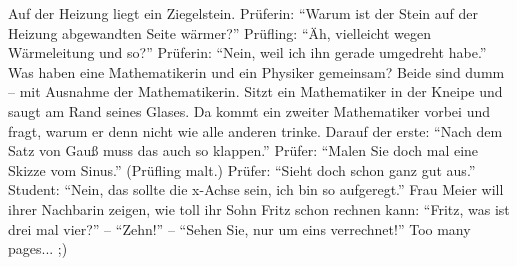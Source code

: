 {	\or Auf der Heizung liegt ein Ziegelstein. Prüferin: \enquote{Warum ist der Stein auf der Heizung abgewandten Seite wärmer?} Prüfling: \enquote{Äh, vielleicht wegen Wärmeleitung und so?} Prüferin: \enquote{Nein, weil ich ihn gerade umgedreht habe.}
	\or Was haben eine Mathematikerin und ein Physiker gemeinsam? Beide sind dumm -- mit Ausnahme der Mathematikerin.
	\or Sitzt ein Mathematiker in der Kneipe und saugt am Rand seines Glases. Da kommt ein zweiter Mathematiker vorbei und fragt, warum er denn nicht wie alle anderen trinke. Darauf der erste: \enquote{Nach dem Satz von Gauß muss das auch so klappen.}
	\or Prüfer: \enquote{Malen Sie doch mal eine Skizze vom Sinus.} (Prüfling malt.) Prüfer: \enquote{Sieht doch schon ganz gut aus.} Student: \enquote{Nein, das sollte die x-Achse sein, ich bin so aufgeregt.}
	\or Frau Meier will ihrer Nachbarin zeigen, wie toll ihr Sohn Fritz schon rechnen kann: \enquote{Fritz, was ist drei mal vier?} -- \enquote{Zehn!} -- \enquote{Sehen Sie, nur um eins verrechnet!}
	\else
	Too many pages... ;)
	\fi
}